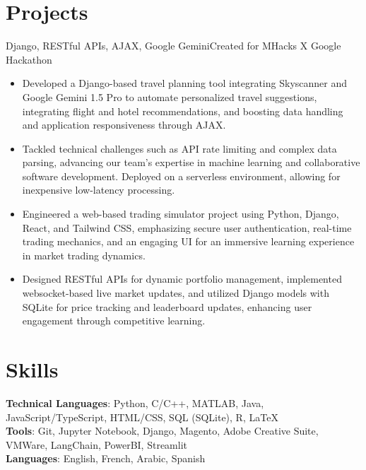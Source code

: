 \documentclass[letterpaper,10.5pt]{article}
\begin{document}
\section{Projects}
{Django, RESTful APIs, AJAX, Google Gemini}{Created for MHacks X Google Hackathon}
\begin{itemize}
    \item Developed a Django-based travel planning tool integrating Skyscanner and Google Gemini 1.5 Pro to automate personalized travel suggestions, integrating flight and hotel recommendations, and boosting data handling and application responsiveness through AJAX.
    \item Tackled technical challenges such as API rate limiting and complex data parsing, advancing our team's expertise in machine learning and collaborative software development. Deployed on a serverless environment, allowing for inexpensive low-latency processing.
\end{itemize}
\begin{itemize}
    \item Engineered a web-based trading simulator project using Python, Django, React, and Tailwind CSS, emphasizing secure user authentication, real-time trading mechanics, and an engaging UI for an immersive learning experience in market trading dynamics.
    
    \item Designed RESTful APIs for dynamic portfolio management, implemented websocket-based live market updates, and utilized Django models with SQLite for price tracking and leaderboard updates, enhancing user engagement through competitive learning.
\end{itemize}
\section{Skills}
\textbf{Technical Languages}: Python, C/C++, MATLAB, Java, JavaScript/TypeScript, HTML/CSS,
SQL (SQLite), R, \LaTeX \\
\textbf{Tools}: Git, Jupyter Notebook, Django, Magento, Adobe Creative Suite, VMWare, LangChain, PowerBI, Streamlit \\
\textbf{Languages}: English, French, Arabic, Spanish
\end{document}
